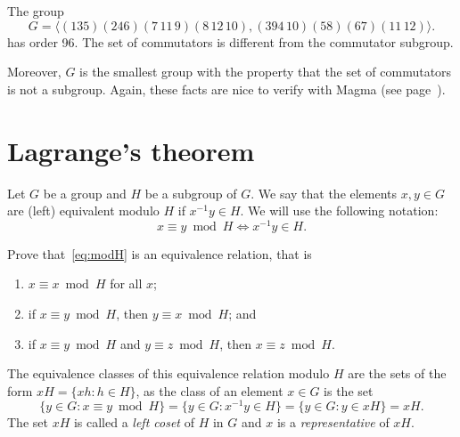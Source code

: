 \begin{optional}
\begin{example}
\label{exa:Guralnick}
The group 
\[
G=\langle (135)(246)(7\,11\,9)(8\,12\,10),(394\,10)(58)(67)(11\,12)\rangle.
\]
has order 96. The set of commutators 
is different from the commutator subgroup. 

Moreover, 
$G$ is the smallest group with the property that  
the set of commutators is not a subgroup. Again, these 
facts are nice to verify with Magma (see page~\pageref{magma:Guralnick}). 
\end{example}
\end{optional}

\section{Lagrange's theorem}

Let $G$ be a group and $H$ be a subgroup of $G$. We say that the elements $x,y\in
G$ are (left) equivalent modulo $H$ if $x^{-1}y\in H$.
We will use the following notation:
\begin{equation}
\label{eq:modH}
    x\equiv y\bmod
    H\Longleftrightarrow x^{-1}y\in H.
\end{equation}

\begin{exercise}
    Prove that~\eqref{eq:modH} is an equivalence relation, that
    is 
    \begin{enumerate}
    \item $x\equiv x\bmod H$ for all $x$; 
    \item if $x\equiv y\bmod H$, then $y\equiv x\bmod H$; and 
    \item if $x\equiv y\bmod H$ and $y\equiv z\bmod H$, then $x\equiv z\bmod H$.
    \end{enumerate}
\end{exercise}

The equivalence classes of this equivalence relation modulo $H$
are the sets of the form $xH=\{xh:h\in H\}$, as the class 
of an element $x\in G$ is the set 
\[
        \{y\in G:x\equiv y\bmod H\}=\{y\in G:x^{-1}y\in H\}=\{y\in G:y\in xH\}=xH.
\]
The set $xH$ is called 
a \emph{left coset} of $H$ in $G$ and $x$ is 
a \emph{representative} of $xH$.

